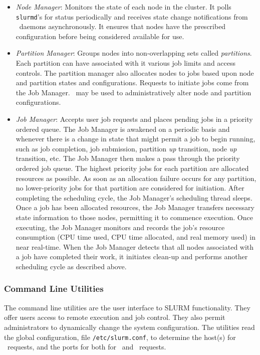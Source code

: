 \begin{itemize}
\item {\em Node Manager}: Monitors the state of each node in
the cluster.  It polls {\tt slurmd}'s for status periodically and
receives state change notifications from \slurmd\ daemons asynchronously.
It ensures that nodes have the prescribed configuration before being 
considered available for use.

\item {\em Partition Manager}: Groups nodes into non-overlapping sets called
{\em partitions}. Each partition can have associated with it various job
limits and access controls.  The partition manager also allocates nodes
to jobs based upon node and partition states and configurations. Requests
to initiate jobs come from the Job Manager.  \scontrol\ may be used
to administratively alter node and partition configurations.

\item {\em Job Manager}: Accepts user job requests and places pending 
jobs in a priority ordered queue. 
The Job Manager is awakened on a periodic basis and whenever there
is a change in state that might permit a job to begin running, such
as job completion, job submission, partition {\em up} transition,
node {\em up} transition, etc.  The Job Manager then makes a pass
through the priority ordered job queue. The highest priority jobs 
for each partition are allocated resources as possible. As soon as an 
allocation failure occurs for any partition, no lower-priority jobs for 
that partition are considered for initiation. 
After completing the scheduling cycle, the Job Manager's scheduling
thread sleeps.  Once a job has been allocated resources, the Job Manager
transfers necessary state information to those nodes, permitting it 
to commence execution.  Once executing, the Job Manager monitors and records
the job's resource consumption (CPU time used, CPU time allocated, and
real memory used) in near real-time.  When the Job Manager detects that
all nodes associated with a job have completed their work, it initiates
clean-up and performs another scheduling cycle as described above.

\end{itemize}

\subsubsection{Command Line Utilities}

The command line utilities are the user interface to SLURM functionality.
They offer users access to remote execution and job control. They also 
permit administrators to dynamically change the system configuration. The 
utilities read the global configuration, file {\tt /etc/slurm.conf}, 
to determine the host(s) for \slurmctld\ requests, and the ports for 
both for \slurmctld\ and \slurmd\ requests. 

